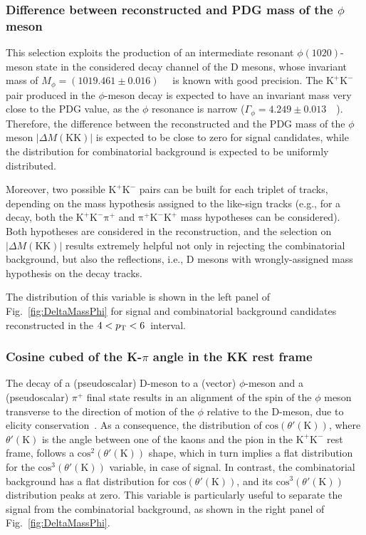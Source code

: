 \subsubsection{Difference between reconstructed and PDG mass of the \boldmath$\phi$ meson}
\begin{sloppypar}
This selection exploits the production of an intermediate resonant $\phi(1020)$-meson state in the considered decay channel of the D mesons, whose invariant mass of \mbox{$M_\phi = (1019.461\pm0.016)$}~\mevcc~\cite{pdg} is known with good precision. The $\mathrm{K^+K^-}$ pair produced in the $\phi$-meson decay is expected to have an invariant mass very close to the PDG value, as the $\phi$ resonance is narrow ($\Gamma_\phi = 4.249\pm0.013$~\mevcc~\cite{pdg}). Therefore, the difference between the reconstructed and the PDG mass of the $\phi$ meson $\lvert\Delta M(\mathrm{KK})\rvert$ is expected to be close to zero for signal candidates, while the distribution for combinatorial background is expected to be uniformly distributed.
\end{sloppypar}
Moreover, two possible $\mathrm{K^+K^-}$ pairs can be built for each triplet of tracks, depending on the mass hypothesis assigned to the like-sign tracks (e.g., for a \ds decay, both the $\mathrm{K^+K^-\pi^+}$ and $\mathrm{\pi^+K^-K^+}$ mass hypotheses can be considered). Both hypotheses are considered in the reconstruction, and the selection on $\lvert\Delta M(\mathrm{KK})\rvert$  results extremely helpful not only in rejecting the combinatorial background, but also the reflections, i.e., D mesons with wrongly-assigned mass hypothesis on the decay tracks.


The distribution of this variable is shown in the left panel of Fig.~\ref{fig:DeltaMassPhi} for signal and combinatorial background candidates reconstructed in the $4 < p_\mathrm{T} < 6$~\gevc interval.

\subsubsection{Cosine cubed of the K-\boldmath$\pi$ angle in the KK rest frame}
The decay of a (pseudoscalar) D-meson to a (vector) $\phi$-meson and a (pseudoscalar) $\pi^+$ final state results in an alignment of the spin of the $\phi$ meson transverse to the direction of motion of the $\phi$ relative to the D-meson, due to elicity conservation~\cite{ATLAS:2015igt}. As a consequence, the distribution of $\mathrm{cos}\left(\theta'(\mathrm K)\right)$, where $\theta'(\mathrm K)$ is the angle between one of the kaons and the pion in the $\mathrm{K^+K^-}$
rest frame, follows a $\mathrm{cos}^2\left(\theta'(\mathrm K)\right)$ shape, which in turn implies a flat distribution for the $\mathrm{cos}^3\left(\theta'(\mathrm K)\right)$ variable, in case of signal. In contrast, the combinatorial background has a flat distribution for $\mathrm{cos}\left(\theta'(\mathrm K)\right)$, and its $\mathrm{cos}^3\left(\theta'(\mathrm K)\right)$ distribution peaks at zero. This variable is particularly useful to separate the signal from the combinatorial background, as shown in the right panel of Fig.~\ref{fig:DeltaMassPhi}.

